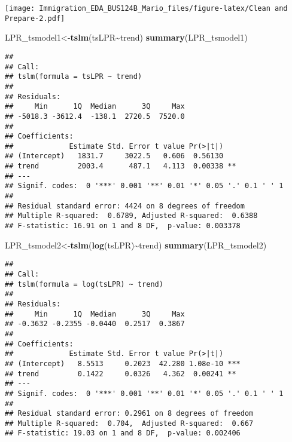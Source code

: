 \documentclass[
]{article}
\newenvironment{Shaded}{\begin{snugshade}}{\end{snugshade}}
\newcommand{\FunctionTok}[1]{\textcolor[rgb]{0.13,0.29,0.53}{\textbf{#1}}}
\newcommand{\NormalTok}[1]{#1}
\newcommand{\OtherTok}[1]{\textcolor[rgb]{0.56,0.35,0.01}{#1}}
\newcommand{\SpecialCharTok}[1]{\textcolor[rgb]{0.81,0.36,0.00}{\textbf{#1}}}
\begin{document}
\texttt{[image: Immigration\_EDA\_BUS124B\_Mario\_files/figure-latex/Clean and Prepare-2.pdf]}

\begin{Shaded}
\begin{Highlighting}[]
\NormalTok{LPR\_tsmodel1}\OtherTok{\textless{}{-}}\FunctionTok{tslm}\NormalTok{(tsLPR}\SpecialCharTok{\textasciitilde{}}\NormalTok{trend)}
\FunctionTok{summary}\NormalTok{(LPR\_tsmodel1)}
\end{Highlighting}
\end{Shaded}

\begin{verbatim}
## 
## Call:
## tslm(formula = tsLPR ~ trend)
## 
## Residuals:
##     Min      1Q  Median      3Q     Max 
## -5018.3 -3612.4  -138.1  2720.5  7520.0 
## 
## Coefficients:
##             Estimate Std. Error t value Pr(>|t|)   
## (Intercept)   1831.7     3022.5   0.606  0.56130   
## trend         2003.4      487.1   4.113  0.00338 **
## ---
## Signif. codes:  0 '***' 0.001 '**' 0.01 '*' 0.05 '.' 0.1 ' ' 1
## 
## Residual standard error: 4424 on 8 degrees of freedom
## Multiple R-squared:  0.6789, Adjusted R-squared:  0.6388 
## F-statistic: 16.91 on 1 and 8 DF,  p-value: 0.003378
\end{verbatim}

\begin{Shaded}
\begin{Highlighting}[]
\NormalTok{LPR\_tsmodel2}\OtherTok{\textless{}{-}}\FunctionTok{tslm}\NormalTok{(}\FunctionTok{log}\NormalTok{(tsLPR)}\SpecialCharTok{\textasciitilde{}}\NormalTok{trend)}
\FunctionTok{summary}\NormalTok{(LPR\_tsmodel2)}
\end{Highlighting}
\end{Shaded}

\begin{verbatim}
## 
## Call:
## tslm(formula = log(tsLPR) ~ trend)
## 
## Residuals:
##     Min      1Q  Median      3Q     Max 
## -0.3632 -0.2355 -0.0440  0.2517  0.3867 
## 
## Coefficients:
##             Estimate Std. Error t value Pr(>|t|)    
## (Intercept)   8.5513     0.2023  42.280 1.08e-10 ***
## trend         0.1422     0.0326   4.362  0.00241 ** 
## ---
## Signif. codes:  0 '***' 0.001 '**' 0.01 '*' 0.05 '.' 0.1 ' ' 1
## 
## Residual standard error: 0.2961 on 8 degrees of freedom
## Multiple R-squared:  0.704,  Adjusted R-squared:  0.667 
## F-statistic: 19.03 on 1 and 8 DF,  p-value: 0.002406
\end{verbatim}
\end{document}
